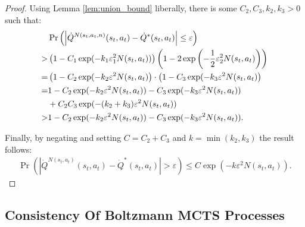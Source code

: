 \begin{proof}
        Using Lemma \ref{lem:union_bound} liberally, there is some $C_2,C_3,k_2,k_3>0$ such that:
        \begin{align}
            &\Pr\left(\left| \dot{Q}^{N(s_t,a_t,n)}(s_t,a_t) - \dot{Q}^*(s_t,a_t) \right| \leq \varepsilon \right) \\
                >& \left(1-C_1\exp(-k_1\varepsilon_1^2 N(s_t,a_t))\right) \left(1-2\exp\left(-\frac{1}{2}\varepsilon_2^2 N(s_t,a_t) \right)\right) \\
                =& \left(1-C_2\exp(-k_2 \varepsilon^2 N(s_t,a_t) \right) \cdot \left(1-C_3\exp(-k_3 \varepsilon^2 N(s_t,a_t)\right) \\
                =& 1 -C_2\exp(-k_2 \varepsilon^2 N(s_t,a_t)) -C_3\exp(-k_3 \varepsilon^2 N(s_t,a_t)) \notag \\
                    &+ C_2C_3\exp(-(k_2+k_3)\varepsilon^2 N(s_t,a_t) ) \\
                >& 1 -C_2\exp(-k_2 \varepsilon^2 N(s_t,a_t)) -C_3\exp(-k_3 \varepsilon^2 N(s_t,a_t)).
        \end{align}
        
        Finally, by negating and setting $C=C_2+C_3$ and $k=\min(k_2,k_3)$ the result follows:
        \begin{align}
                \Pr\left(\left| \dot{Q}^{N(s_t,a_t)}(s_t,a_t) - \dot{Q}^*(s_t,a_t) \right| > \varepsilon \right) \leq C\exp(-k\varepsilon^2 N(s_t,a_t)).
        \end{align}
    \end{proof}






























    
    \subsection{Consistency Of Boltzmann MCTS Processes}

